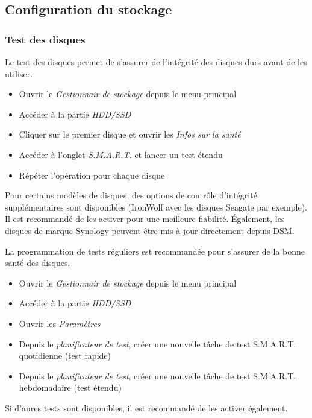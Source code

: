 \subsection{Configuration du stockage}
\subsubsection{Test des disques}
Le test des disques permet de s'assurer de l'intégrité des disques durs avant de les utiliser.
\begin{itemize}
    \item Ouvrir le \textit{Gestionnair de stockage} depuis le menu principal
    \item Accéder à la partie \textit{HDD/SSD}
    \item Cliquer sur le premier disque et ouvrir les \textit{Infos sur la santé}
    \item Accéder à l'onglet \textit{S.M.A.R.T.} et lancer un test étendu
    \item Répéter l'opération pour chaque disque
\end{itemize}

\begin{tip}
Pour certains modèles de disques, des options de contrôle d'intégrité supplémentaires sont disponibles (IronWolf avec les disques Seagate par exemple). Il est recommandé de les activer pour une meilleure fiabilité. Également, les disques de marque Synology peuvent être mis à jour directement depuis DSM.
\end{tip}

La programmation de tests réguliers est recommandée pour s'assurer de la bonne santé des disques.\\
\begin{itemize}
    \item Ouvrir le \textit{Gestionnair de stockage} depuis le menu principal
    \item Accéder à la partie \textit{HDD/SSD}
    \item Ouvrir les \textit{Paramètres}
    \item Depuis le \textit{planificateur de test}, créer une nouvelle tâche de test S.M.A.R.T. quotidienne (test rapide)
    \item Depuis le \textit{planificateur de test}, créer une nouvelle tâche de test S.M.A.R.T. hebdomadaire (test étendu)
\end{itemize}

\begin{tip}
Si d'aures tests sont disponibles, il est recommandé de les activer également.
\end{tip}

